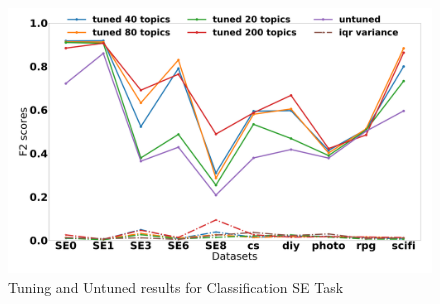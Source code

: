 \documentclass[twocolumn,5p,sort&compress]{elsarticle}
\theoremstyle{break}
\begin{document}
\begin{figure}[!b]
  \begin{center}
    \includegraphics[width=\linewidth]{./fig/F2.png}
    \end{center}
  \caption{Tuning and Untuned results for Classification SE Task}\label{fig:class}  
\end{figure}
\end{document}
